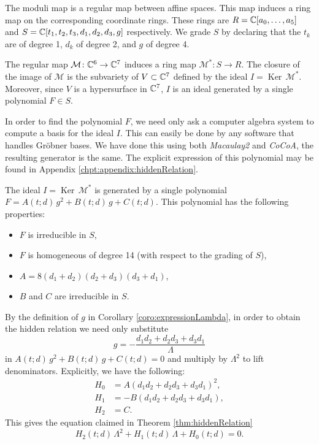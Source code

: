 \documentclass[phd,tocprelim]{cornell}
\begin{document}
The moduli map is a regular map between affine spaces. This map induces a ring map on the corresponding coordinate rings. These rings are $R=\mathbb{C}[a_0,\ldots,a_5]$ and $S=\mathbb{C}[t_1,t_2,t_3,d_1,d_2,d_3,g]$ respectively. We grade $S$ by declaring that the $t_k$ are of degree 1, $d_k$ of degree 2, and $g$ of degree 4. 

\begin{remark}
 The regular map $\mathcal{M}\colon\mathbb{C}^6\to\mathbb{C}^7$ induces a ring map $\mathcal{M}^*\colon S\to R$. The closure of the image of $\mathcal{M}$ is the subvariety of $V\subset\mathbb{C}^7$ defined by the ideal $I=\operatorname{Ker}\,\mathcal{M}^*$. Moreover, since $V$ is a hypersurface in $\mathbb{C}^7$, $I$ is an ideal generated by a single polynomial $F\in S$.
\end{remark}

In order to find the polynomial $F$, we need only ask a computer algebra system to compute a basis for the ideal $I$. This can easily be done by any software that handles Gr\"{o}bner bases. We have done this using both \textit{Macaulay2} and \textit{CoCoA}, the resulting generator is the same. The explicit expression of this polynomial may be found in Appendix \ref{chpt:appendix:hiddenRelation}.

\begin{proposition}\label{prop:descriptionF}
 The ideal $I=\operatorname{Ker}\,\mathcal{M}^*$ is generated by a single polynomial $F=A(t;d)\,g^2+B(t;d)\,g+C(t;d)$. This polynomial has the following properties:
 \begin{itemize}[topsep=-2pt,itemsep=-4pt]
  \item $F$ is irreducible in $S$,
  \item $F$ is homogeneous of degree 14 (with respect to the grading of $S$),
  \item $A=8(d_1+d_2)(d_2+d_3)(d_3+d_1)$,
  \item $B$ and $C$ are irreducible in $S$.
 \end{itemize}
\end{proposition}

By the definition of $g$ in Corollary \ref{coro:expressionLambda}, in order to obtain the hidden relation we need only substitute
 \[ g=-\frac{d_1d_2+d_2d_3+d_3d_1}{\Lambda} \]
in $A(t;d)\,g^2+B(t;d)\,g+C(t;d)=0$ and multiply by $\Lambda^2$ to lift denominators. Explicitly, we have the following:
\begin{align*} 
 H_0 &= A(d_1d_2+d_2d_3+d_3d_1)^2 , \\
 H_1 &= -B(d_1d_2+d_2d_3+d_3d_1), \\
 H_2 &= C .
\end{align*}
This gives the equation claimed in Theorem \ref{thm:hiddenRelation}
 \begin{equation}\label{eq:hiddenRelationBis}
  H_2(t;d)\,\Lambda^2+H_1(t;d)\,\Lambda+H_0(t;d)=0.
 \end{equation}
 
\end{document}
